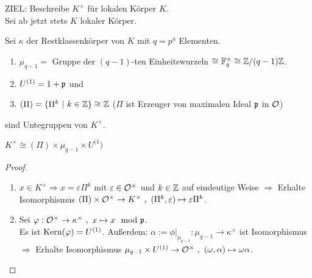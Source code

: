 ZIEL: Beschreibe $K^\times$ für lokalen Körper $K$.\\
Sei ab jetzt stets $K$ lokaler Körper.

\begin{Bem}
Sei $\kappa$ der Restklassenkörper von $K$ mit $q=p^a$ Elementen.
\begin{enumerate}[(1)]
\item $\mu_{q-1}=$ Gruppe der $(q-1)$-ten Einheitswurzeln $\cong \mathbb{F}_q^\times \cong \mathbb{Z}/(q-1)\mathbb{Z}$.
\item $U^{(1)}=1+\mathfrak{p}$ und
\item $(\Pi)=\{\Pi^k \ | \ k \in \mathbb{Z}\}\cong \mathbb{Z}$ ($\Pi$ ist Erzeuger von maximalen Ideal $\mathfrak{p}$ in $\mathcal{O}$)
\end{enumerate}
sind Untegruppen von $K^\times$.
\end{Bem}

\begin{Prop}
$K^\times \cong (\Pi) \times \mu_{q-1} \times U^{(1})$
\end{Prop}

\begin{proof}
	\begin{enumerate}[(1)]
		\item $x \in K^\times \Rightarrow x= \varepsilon \Pi^k$ mit $\varepsilon \in \mathcal{O}^\times$ und $k \in \mathbb{Z}$ auf eindeutige Weise $\Rightarrow$ Erhalte Isomorphismus $(\Pi)\times \mathcal{O}^\times \to K^\times \ , \ (\Pi^k,\varepsilon) \mapsto \varepsilon \Pi^k$.
		\item Sei $\varphi: \mathcal{O}^\times \to \kappa^\times \ , \ x \mapsto x \mod {\mathfrak{p}}$.\\
		Es ist $\operatorname{Kern}(\varphi)=U^{(1)}$. Außerdem: $\alpha:=\phi|_{\mu_{q-1}}: \mu_{q-1} \to \kappa^\times$ ist Isomorphismus\\
		$\Rightarrow$ Erhalte Isomorphismus $\mu_{q-1}\times U^{(1)} \to \mathcal{O}^\times \ , \ (\omega , \alpha) \mapsto \omega \alpha$.
	\end{enumerate}	
\end{proof}